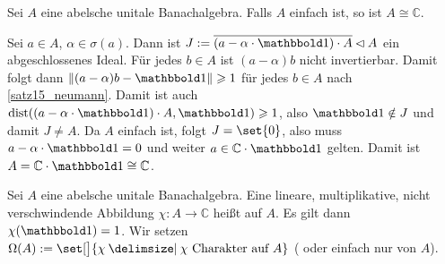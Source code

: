 \begin{proposition}[label=prop1.11_einfach,{name=[Einfache abelsche unitale Banachalgebra]}]
	Sei $A$ eine abelsche unitale Banachalgebra. Falls $A$ einfach ist, so ist $A \cong \mathbb{C}$. 
\end{proposition}
\begin{beweis}
	Sei $a \in A$, $\alpha \in \sigma(a)$. Dann ist $J := \overline{(a-\alpha \cdot \ind)\cdot A} \lhd A$ ein abgeschlossenes Ideal. Für jedes $b \in A$ ist $(a-\alpha)b$ nicht 
	invertierbar. Damit folgt dann $\norm{(a-\alpha)b - \ind}\ge 1$ für jedes $b \in A$ nach \autoref{satz15_neumann}. Damit ist auch 
	$\dist\enbrace*{(a-\alpha \cdot \ind)\cdot A,\ind}\ge 1$, also $\ind \notin J$ und damit $J \not= A$. Da $A$ einfach ist, folgt $J=\set{0}$, also muss 
	$a-\alpha \cdot \ind=0$ und weiter $a \in \mathbb{C} \cdot \ind$ gelten. Damit ist $A = \mathbb{C} \cdot \ind \cong \mathbb{C}$.
\end{beweis}

\begin{definition}[{name=[Charakter]}]
	Sei $A$ eine abelsche unitale Banachalgebra. Eine lineare, multiplikative, nicht verschwindende Abbildung $\chi \colon A \to \mathbb{C}$ heißt  auf $A$.  
	Es gilt dann $\chi(\ind)=1$. Wir setzen $\Omega(A) := \set[\big]{\chi \given \chi \text{ Charakter auf }A}$ ( oder einfach nur  von 
	$A$). 
\end{definition}

